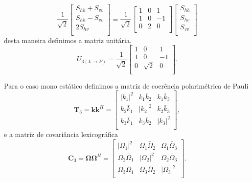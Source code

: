 \begin{equation}\label{trans_matriz_unit_su3}
\frac{1}{\sqrt{2}}\left[
\begin{array}{c}
	  S_{hh} +  S_{vv}\\  
	  S_{hh} -  S_{vv}\\
	  2  S_{hv} \\
\end{array}
\right]=\frac{1}{\sqrt{2}}	
\left[
\begin{array}{rrr}
	1   & 0 & 1  \\
	1   & 0 & -1  \\
	0   & 2 &  0  \\
\end{array}
\right]
\left[
\begin{array}{c}
	S_{hh} \\  
	S_{hv} \\
	S_{vv}\\
\end{array}
\right]
\end{equation}
desta maneira definimos a matriz unitária,
\begin{equation}\label{matriz_unit_su3}
U_{3(L \rightarrow P)}=\frac{1}{\sqrt{2}}	
\left[
\begin{array}{rrr}
	1   & 0 & 1  \\
	1   & 0 & -1  \\
	0   & \sqrt{2} &  0  \\
\end{array}
\right].
\end{equation}

Para o caso mono estático definimos a matriz de coerência polarimétrica de Pauli 
\begin{equation}\label{matriz_polar_pauli_3}
	\mathbf{T}_3=\mathbf{k}\mathbf{k}^H=	
\left[
\begin{array}{rrr}
	|k_1|^2       & k_1\bar{k}_2  & k_1\bar{k}_3  \\
	k_2\bar{k}_1  & |k_2|^2       & k_2\bar{k}_3  \\
	k_3\bar{k}_1  & k_3\bar{k}_2  &    |k_3|^2    \\
\end{array}
\right],
\end{equation}
e a matriz de covariância lexicográfica
\begin{equation}\label{matriz_covar_lexic_3}
	\mathbf{C}_3=\mathbf{\Omega}\mathbf{\Omega}^H=	
\left[
\begin{array}{rrr}
	|\Omega_1|^2       & \Omega_1\bar{\Omega}_2  & \Omega_1\bar{\Omega}_3   \\
	\Omega_2\bar{\Omega}_1  & |\Omega_2|^2       & \Omega_2\bar{\Omega}_3  \\
	\Omega_3\bar{\Omega}_1  & \Omega_3\bar{\Omega}_2  &    |\Omega_3|^2      \\
\end{array}
\right].
\end{equation}

